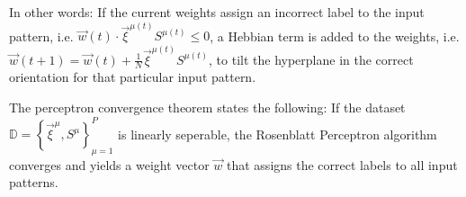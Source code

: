 In other words: If the current weights assign an incorrect label to the input pattern, i.e. \(\vec{w}(t)\cdot\vec{\xi}^{\mu(t)}S^{\mu(t)} \leq 0\), a Hebbian term is added to the weights, i.e. \(\vec{w}(t + 1) = \vec{w}(t) + \frac{1}{N}\vec{\xi}^{\mu(t)}S^{\mu(t)}\), to tilt the hyperplane in the correct orientation for that particular input pattern.

The perceptron convergence theorem\cite{perceptron_slides1} states the following:
If the dataset \(\mathbb{D} = \left\{ \vec{\xi}^\mu, S^\mu \right\} _{\mu=1}^{P}\) is linearly seperable, the Rosenblatt Perceptron algorithm converges and yields a weight vector \(\vec{w}\) that assigns the correct labels to all input patterns.